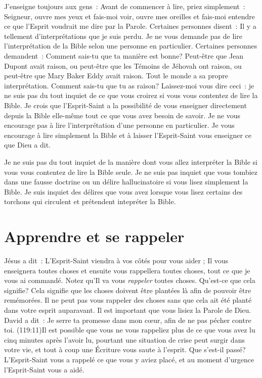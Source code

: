 J'enseigne toujours aux gens~:
 \og Avant de commencer à lire, priez simplement~:
 \og Seigneur, ouvre mes yeux et fais-moi voir,
 ouvre mes oreilles et fais-moi entendre ce que l'Esprit
 voudrait me dire par la Parole. \fg{}
 Certaines personnes disent~:
 \og Il y a tellement d'in\-ter\-pré\-ta\-tions que je suis perdu. \fg{}
 Je ne vous demande pas de lire l'interprétation de la Bible
 selon une personne en particulier.
 Certaines personnes demandent~:
 \og Comment sais-tu que ta manière est bonne? Peut-être que Jean Dupont
 avait raison, ou peut-être que les Témoins de Jéhovah ont raison,
 ou peut-être que Mary Baker Eddy avait raison.
 Tout le monde a sa propre interprétation.
 Comment sais-tu que tu as raison? \fg{}
 Laissez-moi vous dire ceci~: je ne suis pas du tout inquiet
 de ce que vous croirez si vous vous contentez de lire la Bible.
 Je crois que l'Esprit-Saint a la possibilité de vous enseigner
 \ocadr directement depuis la Bible elle-même \fcadr{}
 tout ce que vous avez besoin de savoir.
 Je ne vous encourage pas à lire l'interprétation d'une personne
 en particulier. Je vous encourage à lire simplement la Bible
 et à laisser l'Esprit-Saint vous enseigner ce que Dieu a dit.

Je ne suis pas du tout inquiet de la manière dont vous allez interpréter
 la Bible si vous vous contentez de lire la Bible seule.
 Je ne suis pas inquiet que vous tombiez dans une fausse doctrine
 ou un délire hallucinatoire si vous lisez simplement la Bible.
 Je suis inquiet des délires que vous avez lorsque vous lisez certains
 des torchons qui circulent et prétendent intepréter la Bible.


\section*{Apprendre et se rappeler}

Jésus a dit~: \og L'Esprit-Saint viendra à vos côtés pour vous aider ;
 Il vous enseignera toutes choses et ensuite vous rappellera toutes choses,
 tout ce que je vous ai commandé. \fg{}
 Notez qu'Il va vous \emph{rappeler} toutes choses.
 Qu'est-ce que cela signifie? Cela signifie que les choses
 doivent être plantées là afin de pouvoir être remémorées.
 Il ne peut pas vous rappeler des choses sans que cela ait été planté
 dans votre esprit auparavant. Il est important que vous lisiez
 la Parole de Dieu. David a dit~: \og Je serre ta promesse dans mon cœur,
 afin de ne pas pécher contre toi. \fg{}
 (119:11)Il est possible que vous ne vous rappeliez
 plus de ce que vous avez lu
 cinq minutes après l'avoir lu, pourtant une situation de crise
 peut surgir dans votre vie, et tout à coup une Écriture vous saute
 à l'esprit. Que s'est-il passé? L'Esprit-Saint vous a rappelé
 ce que vous y aviez placé, et au moment d'urgence l'Esprit-Saint
 vous a aidé.

